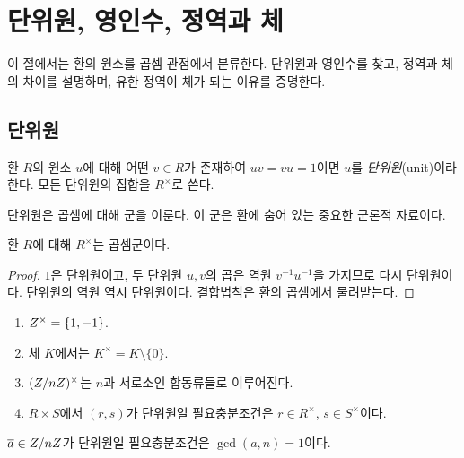 \section{단위원, 영인수, 정역과 체}
\label{sec:ring-units-domains}

\begin{learninggoal}
이 절에서는 환의 원소를 곱셈 관점에서 분류한다. 단위원과 영인수를 찾고, 정역과 체의 차이를 설명하며, 유한 정역이 체가 되는 이유를 증명한다.
\end{learninggoal}

\subsection{단위원}

\begin{definition}[단위원]
환 $R$의 원소 $u$에 대해 어떤 $v\in R$가 존재하여 $uv=vu=1$이면 $u$를 \emph{단위원}(unit)이라 한다. 모든 단위원의 집합을 $R^\times$로 쓴다.
\end{definition}

단위원은 곱셈에 대해 군을 이룬다. 이 군은 환에 숨어 있는 중요한 군론적 자료이다.

\begin{proposition}
환 $R$에 대해 $R^\times$는 곱셈군이다.
\end{proposition}

\begin{proof}
$1$은 단위원이고, 두 단위원 $u,v$의 곱은 역원 $v^{-1}u^{-1}$을 가지므로 다시 단위원이다. 단위원의 역원 역시 단위원이다. 결합법칙은 환의 곱셈에서 물려받는다.
\end{proof}

\begin{example}
\begin{enumerate}[label=(\alph*)]
  \item $Z^\times=\{1,-1\}$.
  \item 체 $K$에서는 $K^\times=K\setminus\{0\}$.
  \item $(Z/nZ)^\times$는 $n$과 서로소인 합동류들로 이루어진다.
  \item $R\times S$에서 $(r,s)$가 단위원일 필요충분조건은 $r\in R^\times$, $s\in S^\times$이다.
\end{enumerate}
\end{example}

\begin{proposition}
$\overline a\in Z/nZ$가 단위원일 필요충분조건은 $\gcd(a,n)=1$이다.
\end{proposition}

